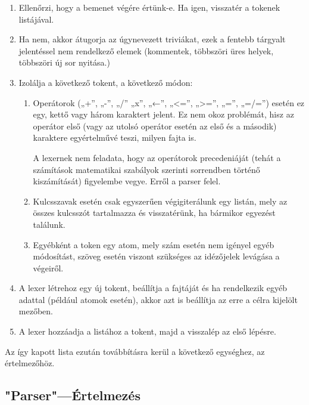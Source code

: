 \begin{enumerate}

    \item Ellenőrzi, hogy a bemenet végére értünk-e. Ha igen, visszatér a tokenek listájával.

    \item Ha nem, akkor átugorja az úgynevezett triviákat, ezek a fentebb tárgyalt jelentéssel nem rendelkező elemek (kommentek, többszöri üres helyek, többszöri új sor nyitása.)

    \item Izolálja a következő tokent, a következő módon:

    \begin{enumerate}

        \item Operátorok („+”, „-”, „/” „x”, „←”, „<=”, „>=”, „=”, „=/=”) esetén ez egy, kettő vagy három karaktert jelent. Ez nem okoz problémát, hisz az operátor első (vagy az utolsó operátor esetén az első és a második) karaktere egyértelművé teszi, milyen fajta is.

A lexernek nem feladata, hogy az operátorok precedeniáját (tehát a számítások matematikai szabályok szerinti sorrendben történő kiszámítását) figyelembe vegye. Erről a parser felel.

        \item Kulcsszavak esetén csak egyszerűen végigiterálunk egy listán, mely az összes kulcsszót tartalmazza és visszatérünk, ha bármikor egyezést találunk.

        \item Egyébként a token egy atom, mely szám esetén nem igényel egyéb módosítást, szöveg esetén viszont szükséges az idézőjelek levágása a végeiről.
    \end{enumerate}

    \item A lexer létrehoz egy új tokent, beállítja a fajtáját és ha rendelkezik egyéb adattal (például atomok esetén), akkor azt is beállítja az erre a célra kijelölt mezőben.

    \item A lexer hozzáadja a listához a tokent, majd a visszalép az első lépésre.

\end{enumerate}

Az így kapott lista ezután továbbításra kerül a következő egységhez, az értelmezőhöz.

\subsection{"Parser"—Értelmezés}

